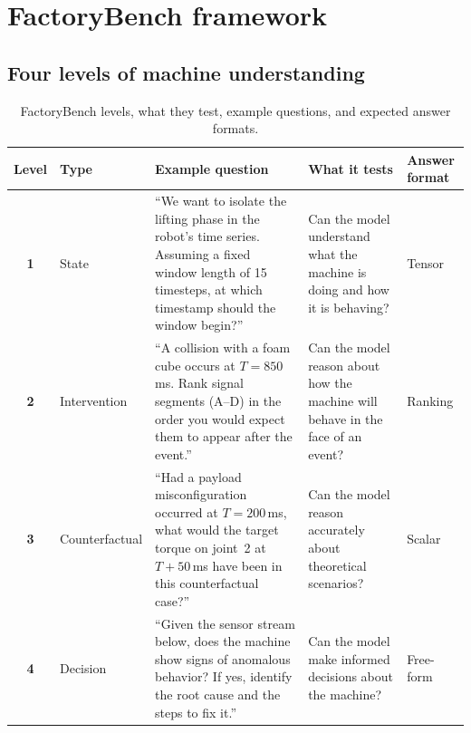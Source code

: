 \section{FactoryBench framework}

\subsection{Four levels of machine understanding}
\label{sec:levels}

\ifworkshopcompact\else
\begin{table}[htbp]
    \centering
    \caption{FactoryBench levels, what they test, example questions, and expected answer formats.}
    \label{tab:levels_examples}
    \footnotesize
    \setlength{\tabcolsep}{4pt}
    \renewcommand{\arraystretch}{1.1}
    \begin{tabular}{@{}c l >{\raggedright\arraybackslash}p{4.6cm} >{\raggedright\arraybackslash}p{3.0cm} >{\raggedright\arraybackslash}p{1.7cm}@{}}
        \toprule
        Level      & Type           & Example question                                                                                                                                                 & What it tests                                                                   & Answer format \\
        \midrule
        \textbf{1} & State          & ``We want to isolate the lifting phase in the robot's time series. Assuming a fixed window length of 15 timesteps, at which timestamp should the window begin?'' & Can the model understand what the machine is doing and how it is behaving?      & Tensor        \\
        \textbf{2} & Intervention   & ``A collision with a foam cube occurs at $T{=}850$\,ms. Rank signal segments (A--D) in the order you would expect them to appear after the event.''              & Can the model reason about how the machine will behave in the face of an event? & Ranking       \\
        \textbf{3} & Counterfactual & ``Had a payload misconfiguration occurred at $T{=}200$\,ms, what would the target torque on joint~2 at $T{+}50$\,ms have been in this counterfactual case?''     & Can the model reason accurately about theoretical scenarios?                    & Scalar        \\
        \textbf{4} & Decision       & ``Given the sensor stream below, does the machine show signs of anomalous behavior? If yes, identify the root cause and the steps to fix it.''                   & Can the model make informed decisions about the machine?                        & Free-form     \\
        \bottomrule
    \end{tabular}
\end{table}
\fi

